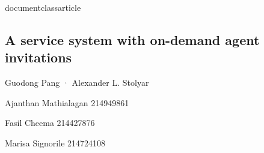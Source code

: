 documentclass{article}
\usepackage[utf8]{inputenc}
\date{}



\begin{center} \section*{A service system with on-demand agent invitations} \end{center}
\newline
\begin{center} Guodong Pang · Alexander L. Stolyar \end{center}
\vspace*{+3cm}
\newline \begin{center} \large Ajanthan Mathialagan 214949861 \end{center}
\newline \begin{center} \large Fasil Cheema 214427876 \end{center}
\newline \begin{center}\large  Marisa Signorile 214724108 \end{center}

\newpage

